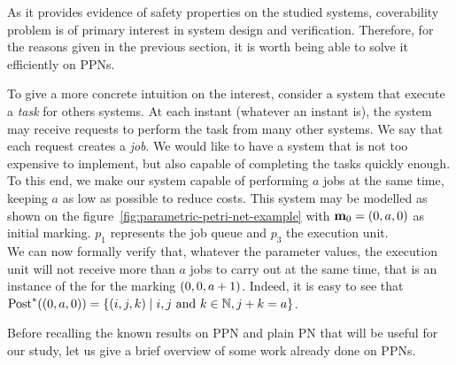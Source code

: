 
As it provides evidence of safety properties on the studied systems, coverability problem is of primary interest in system design and verification. Therefore, for the reasons given in the previous section, it is worth being able to solve it efficiently on \acp{PPN}.

To give a more concrete intuition on the interest, consider a system that execute a \emph{task} for others systems.
At each instant (whatever an instant is), the system may receive requests to perform the task from many other systems. We say that each request creates a \emph{job}.
We would like to have a system that is not too expensive to implement, but also capable of completing the tasks quickly enough.
To this end, we make our system capable of performing $a$ jobs at the same time, keeping $a$ as low as possible to reduce costs.
This system may be modelled as shown on the figure~\ref{fig:parametric-petri-net-example} with $\mari = (0, \param[1], 0)$ as initial marking.
$p_1$ represents the job queue and $p_3$ the execution unit.\\
We can now formally verify that, whatever the parameter values, the execution unit will not receive more than $a$ jobs to carry out at the same time, that is an instance of the \Ecov for the marking $(0, 0, \param[1]+1)$.
Indeed, it is easy to see that $\Post^*((0, \param[1], 0)) = \setComp{(i, j, k)}{i, j \text{ and } k \in \naturals, j + k = \param[1]}$.

Before recalling the known results on \ac{PPN} and plain \ac{PN} that will be useful for our study, let us give a brief overview of some work already done on \acp{PPN}.
